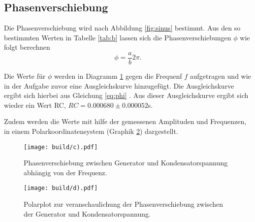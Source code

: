 \subsection{Phasenverschiebung}
\label{sec:c}

Die Phasenverschiebung wird nach Abbildung \ref{fig:sinus} bestimmt. Aus den so bestimmten Werten in Tabelle \ref{tab:b} lassen sich die 
 Phasenverschiebungen $\phi$ wie folgt berechnen
\begin{equation}
  \phi = \frac{a}{b}2 \pi.
\end{equation}

Die Werte für $\phi$ werden in Diagramm \ref{fig:c} gegen die Frequenf $f$ aufgetragen und wie in der Aufgabe zuvor eine Ausgleichskurve 
hinzugefügt. Die Ausgleichskurve ergibt sich hierbei aus Gleichung \ref{eq:phi} . Aus dieser Ausgleichskurve ergibt sich wieder ein Wert RC, $RC = 0.000680 \pm 0.000052$s.


Zudem werden die Werte mit hilfe der gemessenen Amplituden und Frequenzen, in einem Polarkoordinatensystem (Graphik \ref{fig:d}) dargestellt.
\begin{figure}[H]
    \centering
    \texttt{[image: build/c).pdf]}
    \caption{Phasenverschiebung zwischen Generator und Kondensatorspannung abhängig von der Frequenz.}
    \label{fig:c}
\end{figure}
\begin{figure}[H]
    \centering
    \texttt{[image: build/d).pdf]}
    \caption{Polarplot zur veranschaulichung der Phasenverschiebung zwischen der Generator und Kondensatorspannung.}
    \label{fig:d}
\end{figure}

